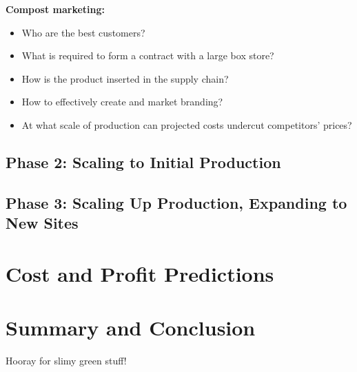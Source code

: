 \documentclass{article}
\begin{document}
\textbf{Compost marketing:}
\begin{itemize}
  \item{Who are the best customers?}
  \item{What is required to form a contract with a large box store?}
  \item{How is the product inserted in the supply chain?}
  \item{How to effectively create and market branding?}
  \item{At what scale of production can projected costs undercut competitors' prices?}
\end{itemize}


\subsection{Phase 2: Scaling to Initial Production}

\subsection{Phase 3: Scaling Up Production, Expanding to New Sites}

\section{Cost and Profit Predictions}

\section{Summary and Conclusion}

Hooray for slimy green stuff!
\end{document}
